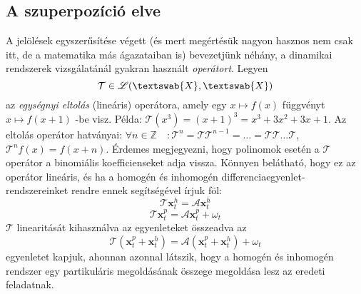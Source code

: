 \documentclass[14p]{article}
\begin{document}
\subsection{A szuperpozíció elve}
A jelölések egyszerűsítése végett (és mert megértésük nagyon hasznos nem csak itt, de a matematika más ágazataiban is) bevezetjünk néhány, a dinamikai rendszerek vizsgálatánál gyakran használt \emph{operátort}\footnotemark{}. Legyen
\[
	\mathcal{T} \in \mathscr{L}(\textswab{X},\textswab{X}) 
\] 
az \emph{egységnyi eltolás} (lineáris) operátora, amely egy $x \mapsto f(x)$ függvényt $x \mapsto f(x+1)$ -be visz. Példa:  $\mathcal{T}(x^3) = (x+1)^3 = x^3 + 3x^2 + 3x + 1$. Az eltolás operátor hatványai: $\forall n \in \mathbb{Z} \quad \colon \mathcal{T}^{n} = \mathcal{T}\mathcal{T}^{n-1} = \dots = \mathcal{T}\mathcal{T} \dots \mathcal{T}$, \quad $\mathcal{T}^{n} f(x) = f(x+n)$. 
Érdemes megjegyezni, hogy polinomok esetén a $\mathcal{T}$ operátor a binomiális koefficienseket adja vissza.
Könnyen belátható, hogy ez az operátor lineáris, és ha a homogén és inhomogén differenciaegyenlet-rendszereinket rendre ennek segítségével írjuk föl:
\[
	\mathcal{T}\pmb{x}^{h}_{t} = \mathcal{A}\pmb{x}^{h}_{t}
\]
\[
	\mathcal{T}\pmb{x}^{p}_{t} = \mathcal{A}\pmb{x}^{p}_{t} + \omega_{t}
\]
$\mathcal{T}$ linearitását kihasználva az egyenleteket összeadva az
\[
	\mathcal{T}(\pmb{x}^{p}_{t}+  \pmb{x}^{h}_{t}) = \mathcal{A}(\pmb{x}^{p}_{t}+  \pmb{x}^{h}_{t}) + \omega_{t}
\]
egyenletet kapjuk, ahonnan azonnal látszik, hogy a homogén és inhomogén rendszer egy partikuláris megoldásának összege megoldása lesz az eredeti feladatnak.
\end{document}
